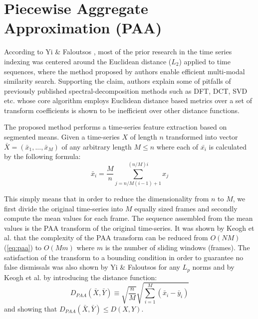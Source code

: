 \section{Piecewise Aggregate Approximation (PAA)} \label{paa}
According to Yi \& Faloutsos \cite{citeulike:2946589}, most of the prior research in the time series indexing was centered around the Euclidean distance ($L_{2}$) applied to time sequences, where the method proposed by authors enable efficient multi-modal similarity search. Supporting the claim, authors explain some of pitfalls of previously published spectral-decomposition methods such as DFT, DCT, SVD etc. whose core algorithm employs Euclidean distance based metrics over a set of transform coefficients is shown to be inefficient over other distance functions.

The proposed method performs a time-series feature extraction based on segmented means. Given a time-series $X$ of length $n$ transformed into vector $\bar{X} = ( \bar{x}_{1}, ..., \bar{x}_{M} )$ of any arbitrary length $M \leq n$ where each of $\bar{x_{i}}$ is calculated by the following formula:
\begin{equation}
\bar{x}_{i} = \frac{M}{n} \sum_{j=n/M(i-1)+1}^{(n/M)i} x_{j}
\label{eq:paa}
\end{equation}

This simply means that in order to reduce the dimensionality from $n$ to $M$, we first divide the original time-series into $M$ equally sized frames and secondly compute the mean values for each frame. The sequence assembled from the mean values is the PAA transform of the original time-series. It was shown by Keogh et al. that the complexity of the PAA transform can be reduced from $O(NM)$ (\ref{eq:paa}) to $O(Mm)$ where $m$ is the number of sliding windows (frames). The satisfaction of the transform to a bounding condition in order to guarantee no false dismissals was also shown by Yi \& Faloutsos for any $L_{p}$ norms and by Keogh et al. \cite{citeulike:3000416} by introducing the distance function:
\begin{equation}
D_{PAA}(\bar{X}, \bar{Y}) \equiv \sqrt{\frac{n}{M}} \sqrt{ \sum_{i=1}^{M} 
\left(  \bar{x}_{i} - \bar{y}_{i} \right)}
\label{eq:paa_distance}
\end{equation}
and showing that $D_{PAA}(\bar{X}, \bar{Y}) \leq D(X,Y)$.

